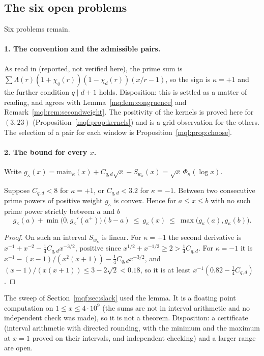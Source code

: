 \subsection{The six open problems}\label{mqf:sec:open}

Six problems remain.

\paragraph{1. The convention and the admissible pairs.} As read in \cite{Rub26} (reported, not verified here), the prime sum is $\sum\Lambda(r)(1+\chi_q(r))(1-\chi_d(r))(x/r-1)$, so the sign is $\kappa=+1$ and the further condition $q\mid d+1$ holds. Disposition: this is settled as a matter of reading, and agrees with Lemma~\ref{mq:lem:congruence} and Remark~\ref{mql:rem:secondweight}. The positivity of the kernels is proved here for $(3,23)$ (Proposition~\ref{mqf:prop:kernels}) and is a grid observation for the others. The selection of a pair for each window is Proposition~\ref{mql:prop:choose}.

\paragraph{2. The bound for every $x$.} Write $g_\kappa(x)=\mathrm{main}_\kappa(x)+C_{q,d}\sqrt x-S_{w_\kappa}(x)=\sqrt x\,\Phi_\kappa(\log x)$.

\begin{lemma}\label{mqf:lem:convex}
Suppose $C_{q,d}<8$ for $\kappa=+1$, or $C_{q,d}<3.2$ for $\kappa=-1$. Between two consecutive prime powers of positive weight $g_\kappa$ is convex. Hence for $a\le x\le b$ with no such prime power strictly between $a$ and $b$
\[
g_\kappa(a)+\min\bigl(0,g_\kappa'(a^+)\bigr)(b-a)\ \le\ g_\kappa(x)\ \le\ \max\bigl(g_\kappa(a),g_\kappa(b)\bigr).
\]
\end{lemma}

\begin{proof}
On such an interval $S_{w_\kappa}$ is linear. For $\kappa=+1$ the second derivative is $x^{-1}+x^{-2}-\frac14C_{q,d}x^{-3/2}$, positive since $x^{1/2}+x^{-1/2}\ge2>\frac14C_{q,d}$. For $\kappa=-1$ it is $x^{-1}-(x-1)/(x^2(x+1))-\frac14C_{q,d}x^{-3/2}$, and $(x-1)/(x(x+1))\le3-2\sqrt2<0.18$, so it is at least $x^{-1}(0.82-\frac14C_{q,d})$.\end{proof}

The sweep of Section~\ref{mqf:sec:slack} used the lemma. It is a floating point computation on $1\le x\le4\cdot10^9$ (the sums are not in interval arithmetic and no independent check was made), so it is not a theorem. Disposition: a certificate (interval arithmetic with directed rounding, with the minimum and the maximum at $x=1$ proved on their intervals, and independent checking) and a larger range are open.

